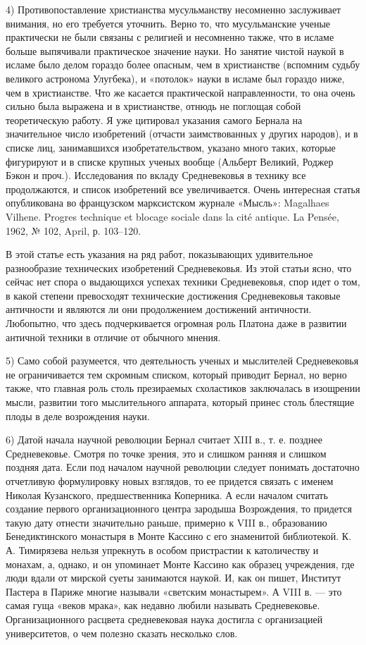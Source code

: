 4) Противопоставление христианства мусульманству несомненно заслуживает
внимания, но его требуется уточнить. Верно то, что мусульманские ученые
практически не были связаны с религией и несомненно также, что в исламе
больше выпячивали практическое значение науки. Но занятие чистой наукой в
исламе было делом гораздо более опасным, чем в христианстве (вспомним
судьбу великого астронома Улугбека), и «потолок» науки в исламе был гораздо
ниже, чем в христианстве. Что же касается практической направленности, то она
очень сильно была выражена и в христианстве, отнюдь не поглощая собой
теоретическую работу. Я уже цитировал указания самого Бернала на
значительное число изобретений (отчасти заимствованных у других народов), и в
списке лиц, занимавшихся изобретательством, указано много таких, которые
фигурируют и в списке крупных ученых вообще (Альберт Великий, Роджер Бэкон и
проч.). Исследования по вкладу Средневековья в технику все продолжаются, и
список изобретений все увеличивается. Очень интересная статья опубликована во
французском марксистском журнале «Мысль»: Magalhaes Vilhene. Progres technique
et blocage sociale dans la cit\'{e} antique. La Pens\'{e}e, 1962, № 102, April, р. 103--120.

В этой статье есть указания на ряд работ, показывающих удивительное
разнообразие технических изобретений Средневековья. Из этой статьи ясно, что
сейчас нет спора о выдающихся успехах техники Средневековья, спор идет о
том, в какой степени превосходят технические достижения Средневековья
таковые античности и являются ли они продолжением достижений античности.
Любопытно, что здесь подчеркивается огромная роль Платона даже в развитии
античной техники в отличие от обычного мнения.

5) Само собой разумеется, что деятельность ученых и мыслителей
Средневековья не ограничивается тем скромным списком, который приводит
Бернал, но верно также, что главная роль столь презираемых схоластиков
заключалась в изощрении мысли, развитии того мыслительного аппарата,
который принес столь блестящие плоды в деле возрождения науки.

6) Датой начала научной революции Бернал считает XIII в., т. е. позднее
Средневековье. Смотря по точке зрения, это и слишком ранняя и слишком
поздняя дата. Если под началом научной революции следует понимать
достаточно отчетливую формулировку новых взглядов, то ее придется связать с
именем Николая Кузанского, предшественника Коперника. А если началом
считать создание первого организационного центра зародыша Возрождения, то
придется такую дату отнести значительно раньше, примерно к VIII в.,
образованию Бенедиктинского монастыря в Монте Кассино с его знаменитой
библиотекой. К. А. Тимирязева нельзя упрекнуть в особом пристрастии к
католичеству и монахам, а, однако, и он упоминает Монте Кассино как образец
учреждения, где люди вдали от мирской суеты занимаются наукой. И, как он
пишет, Институт Пастера в Париже многие называли «светским монастырем». А
VIII в. --- это самая гуща «веков мрака», как недавно любили называть
Средневековье. Организационного расцвета средневековая наука достигла с
организацией университетов, о чем полезно сказать несколько слов.

